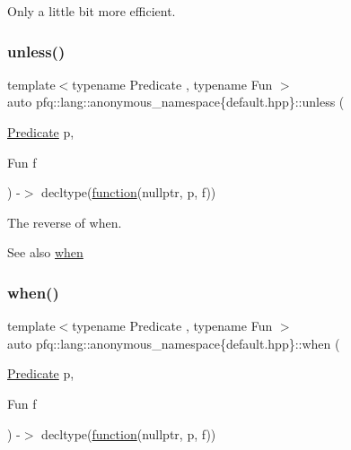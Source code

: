 Only a little bit more efficient. \mbox{\label{namespacepfq_1_1lang_1_1anonymous__namespace_02default_8hpp_03_a02b7a7ced297504fd2fac0c627c60394}} 
\subsubsection{\texorpdfstring{unless()}{unless()}}
{\footnotesize\ttfamily template$<$typename Predicate , typename Fun $>$ \\
auto pfq\+::lang\+::anonymous\+\_\+namespace\{default.\+hpp\}\+::unless (\begin{DoxyParamCaption}\item[{\hyperlink{structpfq_1_1lang_1_1Predicate}{Predicate}}]{p,  }\item[{Fun}]{f }\end{DoxyParamCaption}) -\/$>$ decltype(\hyperlink{namespacepfq_1_1lang_a1a4638059d700ae08d0ca63886ff2bb3}{function}(nullptr, p, f))
        }



The reverse of {\ttfamily when}. 

\begin{DoxySeeAlso}{See also}
\hyperlink{namespacepfq_1_1lang_1_1anonymous__namespace_02default_8hpp_03_a2d4da33f2a8bc0abe351c8531bfd161f}{when} 
\end{DoxySeeAlso}
\mbox{\label{namespacepfq_1_1lang_1_1anonymous__namespace_02default_8hpp_03_a2d4da33f2a8bc0abe351c8531bfd161f}} 
\subsubsection{\texorpdfstring{when()}{when()}}
{\footnotesize\ttfamily template$<$typename Predicate , typename Fun $>$ \\
auto pfq\+::lang\+::anonymous\+\_\+namespace\{default.\+hpp\}\+::when (\begin{DoxyParamCaption}\item[{\hyperlink{structpfq_1_1lang_1_1Predicate}{Predicate}}]{p,  }\item[{Fun}]{f }\end{DoxyParamCaption}) -\/$>$ decltype(\hyperlink{namespacepfq_1_1lang_a1a4638059d700ae08d0ca63886ff2bb3}{function}(nullptr, p, f))
        }



